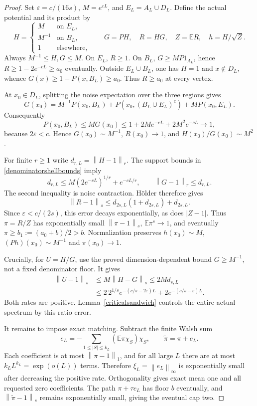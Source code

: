 \documentclass[11pt]{article}
\newcommand{\E}{\mathbb E}
\newcommand{\norm}[1]{\left\|#1\right\|}
\begin{document}
\begin{proof}
Set $\varepsilon=c/(16s)$, $M=e^{\varepsilon L}$, and $E_L=A_L\cup D_L$.
Define the actual potential and its product by
\[
 H=\begin{cases}M&\text{on }E_L,\\M^{-1}&\text{on }B_L,\\1&\text{elsewhere},\end{cases}
 \qquad G=PH,\quad R=HG,\quad Z=\E R,\quad h=H/\sqrt Z.
\]
Always $M^{-1}\leq H,G\leq M$. On $E_L$, $R\geq1$. On $B_L$,
$G\geq MP1_{A_L}$, hence $R\geq1-2e^{-cL}\geq a_0$ eventually.
Outside $E_L\cup B_L$, one has $H=1$ and $x\notin D_L$, whence
$G(x)\geq1-P(x,B_L)\geq a_0$. Thus $R\geq a_0$ at every vertex.

At $x_0\in D_L$, splitting the noise expectation over the three
regions gives
\[
 G(x_0)=M^{-1}P(x_0,B_L)+P(x_0,(B_L\cup E_L)^c)+MP(x_0,E_L).
\]
Consequently
\[
 P(x_0,B_L)\leq MG(x_0)
       \leq1+2Me^{-cL}+2M^2e^{-cL}\longrightarrow1,
\]
because $2\varepsilon<c$. Hence $G(x_0)\sim M^{-1}$,
$R(x_0)\to1$, and $H(x_0)/G(x_0)\sim M^2$.

For finite $r\geq1$ write $d_{r,L}=\norm{H-1}_r$. The support
bounds in \eqref{denominatorshellbounds} imply
\[
 d_{r,L}\leq M(2e^{-cL})^{1/r}+e^{-cL/r},\qquad
 \norm{G-1}_r\leq d_{r,L}.
\]
The second inequality is noise contraction. H\"older therefore gives
\[
 \norm{R-1}_s\leq d_{2s,L}(1+d_{2s,L})+d_{2s,L}.
\]
Since $\varepsilon<c/(2s)$, this error decays exponentially, as does
$|Z-1|$. Thus $\pi=R/Z$ has exponentially small $\norm{\pi-1}_s$,
$\E\pi^s\to1$, and eventually $\pi\geq b_1:=(a_0+b)/2>b$.
Normalization preserves $h(x_0)\sim M$, $(Ph)(x_0)\sim M^{-1}$
and $\pi(x_0)\to1$.

Crucially, for $U=H/G$, use the proved dimension-dependent bound
$G\geq M^{-1}$, not a fixed denominator floor. It gives
\begin{align}
 \norm{U-1}_s&\leq M\norm{H-G}_s\leq2M d_{s,L}\nonumber\\
 &\leq2\,2^{1/s}e^{-(c/s-2\varepsilon)L}
          +2e^{-(c/s-\varepsilon)L}.\label{vanishingdenominatorratio}
\end{align}
Both rates are positive. Lemma~\ref{criticalsandwich} controls the
entire actual spectrum by this ratio error.

It remains to impose exact matching. Subtract the finite Walsh sum
\[
 e_L=-\sum_{1\leq|S|\leq k_L}(\E\pi\chi_S)\chi_S,
 \qquad \widetilde\pi=\pi+e_L.
\]
Each coefficient is at most $\norm{\pi-1}_1$, and for all large $L$
there are at most $k_LL^{k_L}=\exp(o(L))$ terms. Therefore
$\xi_L=\norm{e_L}_\infty$ is exponentially small after decreasing
the positive rate. Orthogonality gives exact mean one and all requested
zero coefficients. The path $\pi+\tau e_L$ has floor $b$ eventually,
and $\norm{\widetilde\pi-1}_s$ remains exponentially small, giving
the eventual cap two.


\end{proof}
\end{document}
